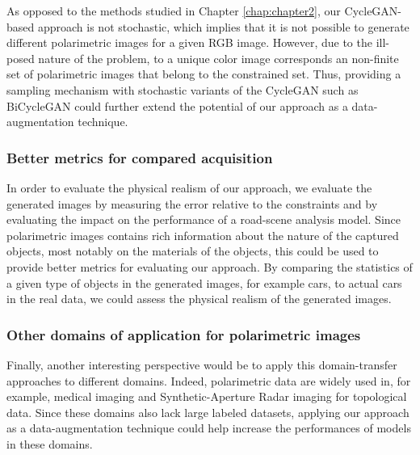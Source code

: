 As opposed to the methods studied in Chapter \ref{chap:chapter2}, our CycleGAN-based approach is not stochastic, which implies that it is not possible to generate different polarimetric images for a given RGB image. However, due to the ill-posed nature of the problem, to a unique color image corresponds an non-finite set of polarimetric images that belong to the constrained set. Thus, providing a sampling mechanism with stochastic variants of the CycleGAN such as BiCycleGAN \citep{Zhu2017b} could further extend the potential of our approach as a data-augmentation technique.

\subsubsection*{Better metrics for compared acquisition}

In order to evaluate the physical realism of our approach, we evaluate the generated images by measuring the error relative to the constraints and by evaluating the impact on the performance of a road-scene analysis model. Since polarimetric images contains rich information about the nature of the captured objects, most notably on the materials of the objects, this could be used to provide better metrics for evaluating our approach. By comparing the statistics of a given type of objects in the generated images, for example cars, to actual cars in the real data, we could assess the physical realism of the generated images.

\subsubsection*{Other domains of application for polarimetric images}

Finally, another interesting perspective would be to apply this domain-transfer approaches to different domains. Indeed, polarimetric data are widely used in, for example, medical imaging \citep{Kupinski2018, Rehbinder2016} and Synthetic-Aperture Radar \citep{vanZyl2011} imaging for topological data. Since these domains also lack large labeled datasets, applying our approach as a data-augmentation technique could help increase the performances of models  in these domains.